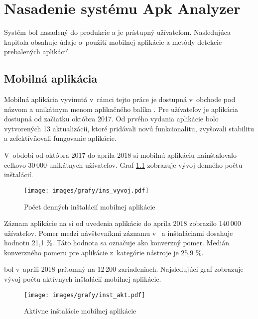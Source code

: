 \chapter{Nasadenie systému Apk Analyzer}
Systém  bol nasadený do produkcie a je prístupný užívateľom. Nasledujúca kapitola obsahuje údaje o~použití mobilnej aplikácie a metódy detekcie prebalených aplikácií.

\section{Mobilná aplikácia}

Mobilná aplikácia vyvinutá v~rámci tejto práce je dostupná v~obchode  pod názvom  a unikátnym menom aplikačného balíka . Pre užívateľov je aplikácia dostupná od začiatku októbra 2017. Od prvého vydania aplikácie bolo vytvorených 13 aktualizácií, ktoré pridávali novú funkcionalitu, zvyšovali stabilitu a zefektívňovali fungovanie aplikácie.

V~období od októbra 2017 do apríla 2018 si mobilnú aplikáciu nainštalovalo celkovo 30\,000 unikátnych užívateľov. Graf \ref{fig:inst-app} zobrazuje vývoj denného počtu inštalácií. 

\begin{figure}[htb]
  \begin{center}
    \texttt{[image: images/grafy/ins\_vyvoj.pdf]}
  \end{center}
  \caption{Počet denných inštalácií mobilnej aplikácie}
  \label{fig:inst-app}
\end{figure}

Záznam aplikácie na  si od uvedenia aplikácie do apríla 2018 zobrazilo 140\,000 užívateľov. Pomer medzi návštevníkmi záznamu v~ a inštaláciami dosahuje hodnotu 21,1 \%. Táto hodnota sa označuje ako konverzný pomer. 
Medián konverzného pomeru pre aplikácie z~kategórie nástroje je 25,9 \%. 

 bol v~apríli 2018 prítomný na 12\,200 zariadeniach. Najsledujúci graf zobrazuje vývoj počtu aktívnych inštalácií mobilnej aplikácie.

\begin{figure}[htb]
  \begin{center}
    \texttt{[image: images/grafy/inst\_akt.pdf]}
  \end{center}
  \caption{Aktívne inštalácie mobilnej aplikácie}
  \label{fig:inst-akt}
\end{figure}


